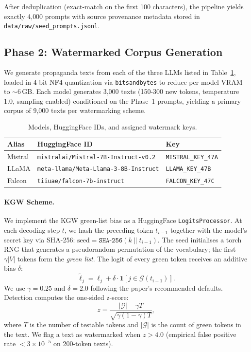 \documentclass[11pt]{article}
\begin{document}
After deduplication (exact-match on the first 100 characters), the pipeline
yields exactly 4{,}000 prompts with source provenance metadata stored in
\texttt{data/raw/seed\_prompts.jsonl}.

\subsection{Phase 2: Watermarked Corpus Generation}
\label{sec:phase2}

We generate propaganda texts from each of the three LLMs listed in
Table~\ref{tab:models}, loaded in 4-bit NF4 quantization via
\texttt{bitsandbytes} \cite{dettmers2022llmint8} to reduce per-model VRAM to
$\sim$6\,GB.
Each model generates 3{,}000 texts (150-300 new tokens, temperature 1.0,
sampling enabled) conditioned on the Phase~1 prompts, yielding a primary
corpus of 9{,}000 texts per watermarking scheme.

\begin{table}[t]
\centering
\small
\begin{tabular}{@{}lll@{}}
\toprule
\textbf{Alias} & \textbf{HuggingFace ID} & \textbf{Key} \\
\midrule
Mistral & \texttt{mistralai/Mistral-7B-Instruct-v0.2} & \texttt{MISTRAL\_KEY\_47A} \\
LLaMA   & \texttt{meta-llama/Meta-Llama-3-8B-Instruct}& \texttt{LLAMA\_KEY\_47B}   \\
Falcon  & \texttt{tiiuae/falcon-7b-instruct}          & \texttt{FALCON\_KEY\_47C}  \\
\bottomrule
\end{tabular}
\caption{Models, HuggingFace IDs, and assigned watermark keys.}
\label{tab:models}
\end{table}

\paragraph{KGW Scheme.}
We implement the KGW green-list bias \cite{kirchenbauer2023watermark} as a
HuggingFace \texttt{LogitsProcessor}.
At each decoding step $t$, we hash the preceding token $t_{i-1}$ together with
the model's secret key via SHA-256:
$\text{seed} = \texttt{SHA-256}(k \| t_{i-1})$.
The seed initialises a torch RNG that generates a pseudorandom permutation of
the vocabulary; the first $\gamma|V|$ tokens form the \emph{green list}.
The logit of every green token receives an additive bias $\delta$:
\begin{equation}
\tilde{\ell}_j = \ell_j + \delta \cdot \mathbf{1}[j \in \mathcal{G}(t_{i-1})].
\end{equation}
We use $\gamma = 0.25$ and $\delta = 2.0$ following the paper's recommended
defaults.
Detection computes the one-sided z-score:
\begin{equation}
z = \frac{|\mathcal{G}| - \gamma T}{\sqrt{\gamma(1-\gamma) T}},
\end{equation}
where $T$ is the number of testable tokens and $|\mathcal{G}|$ is the count of
green tokens in the text.
We flag a text as watermarked when $z > 4.0$ (empirical false positive rate
$< 3 \times 10^{-5}$ on 200-token texts).
\end{document}
